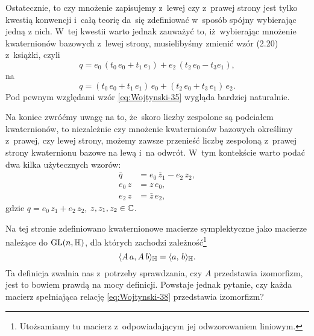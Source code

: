 \documentclass[a4paper,11pt]{article}
\numberwithin{equation}{section}
\begin{document}
Ostatecznie, to czy mnożenie zapisujemy z~lewej czy z~prawej strony jest
tylko kwestią konwencji i~całą teorię da~się zdefiniować w~sposób spójny
wybierając jedną z nich. W~tej kwestii warto jednak zauważyć to,
iż~wybierając mnożenie kwaternionów bazowych z~lewej strony, musielibyśmy
zmienić wzór (2.20) z~książki, czyli
\begin{equation}
  \label{eq:Wojtynski-35}
  q =
  e_{ 0 } \, ( t_{ 0 } \, e_{ 0 } + t_{ 1 } \, e_{ 1 } )
  + e_{ 2 } \, ( t_{ 2 } \, e_{ 0 } - t_{ 3 } e_{ 1 } ),
\end{equation}
na
\begin{equation}
  \label{eq:Wojtynski-36}
  q =
  ( t_{ 0 } \, e_{ 0 } + t_{ 1 } \, e_{ 1 } ) \, e_{ 0 }
  + ( t_{ 2 } \, e_{ 0 } + t_{ 3 } \, e_{ 1 } ) \, e_{ 2 }.
\end{equation}
Pod pewnym względami wzór \eqref{eq:Wojtynski-35} wygląda bardziej
naturalnie.

Na koniec zwróćmy uwagę na to, że~skoro liczby zespolone są podciałem
kwaternionów, to niezależnie czy mnożenie kwaternionów bazowych określimy
z~prawej, czy lewej strony, możemy zawsze przenieść liczbę zespoloną
z~prawej strony kwaternionu bazowe na lewą i~na odwrót. W~tym kontekście
warto podać dwa kilka użytecznych wzorów:
\begin{subequations}
  \begin{align}
    \label{eq:Wojtynski-37-A}
    \bar{q} &= e_{ 0 } \, \bar{z}_{ 1 } - e_{ 2 } \, z_{ 2 }, \\
    \label{eq:Wojtynski-37-B}
    e_{ 0 } \, z &= z \, e_{ 0 }, \\
    \label{eq:Wojtynski-37-C}
    e_{ 2 } \, z &= \bar{z} \, e_{ 2 },
  \end{align}
\end{subequations}
gdzie
$q = e_{ 0 } \, z_{ 1 } + e_{ 2 } \, z_{ 2 }$, $z, z_{ 1 }, z_{ 2 } \in \mathbb{C}$.

\VerSpaceFour





\noindent
{} Na tej stronie zdefiniowano kwaternionowe macierze symplektyczne
jako macierze należące do $\mathrm{GL}( n, \mathbb{H} )$, dla których zachodzi
zależność\footnote{Utożsamiamy tu macierz z~odpowiadającym jej
  odwzorowaniem liniowym.}
\begin{equation}
  \label{eq:Wojtynski-38}
  \langle A \, a, A \, b \rangle_{ \mathbb{H} } = \langle a, \, b \rangle_{ \mathbb{H} }.
\end{equation}
Ta definicja zwalnia nas z~potrzeby sprawdzania, czy $A$ przedstawia
izomorfizm, jest to bowiem prawdą na mocy definicji. Powstaje jednak
pytanie, czy każda macierz spełniająca relację \eqref{eq:Wojtynski-38}
przedstawia izomorfizm?
\end{document}
